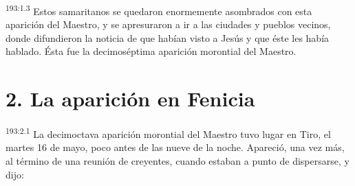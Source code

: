 \par 
\textsuperscript{193:1.3} Estos samaritanos se quedaron enormemente asombrados con esta aparición del Maestro, y se apresuraron a ir a las ciudades y pueblos vecinos, donde difundieron la noticia de que habían visto a Jesús y que éste les había hablado. Ésta fue la decimoséptima aparición morontial del Maestro.

\section*{2. La aparición en Fenicia}
\par 
\textsuperscript{193:2.1} La decimoctava aparición morontial del Maestro tuvo lugar en Tiro, el martes 16 de mayo, poco antes de las nueve de la noche. Apareció, una vez más, al término de una reunión de creyentes, cuando estaban a punto de dispersarse, y dijo:

